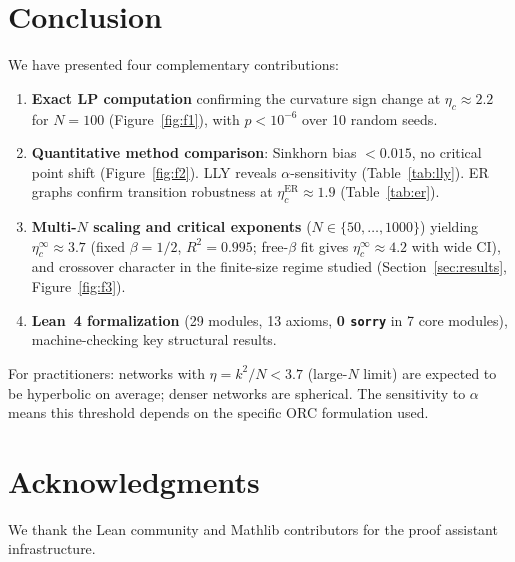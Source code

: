\documentclass[12pt]{article}
\newcommand{\etac}{\eta_c}
\newcommand{\sorry}{\texttt{sorry}}
\begin{document}
\section{Conclusion}
\label{sec:conc}

We have presented four complementary contributions:

\begin{enumerate}
  \item \textbf{Exact LP computation} confirming the curvature sign change at
  $\etac \approx 2.2$ for $N = 100$ (Figure~\ref{fig:f1}), with $p < 10^{-6}$ over 10
  random seeds.

  \item \textbf{Quantitative method comparison}: Sinkhorn bias $< 0.015$, no critical point
  shift (Figure~\ref{fig:f2}). LLY reveals $\alpha$-sensitivity (Table~\ref{tab:lly}). ER
  graphs confirm transition robustness at $\etac^{\mathrm{ER}} \approx 1.9$
  (Table~\ref{tab:er}).

  \item \textbf{Multi-$N$ scaling and critical exponents} ($N \in \{50,\ldots,1000\}$)
  yielding $\etac^\infty \approx 3.7$ (fixed $\beta = 1/2$, $R^2 = 0.995$; free-$\beta$
  fit gives $\etac^\infty \approx 4.2$ with wide CI), and crossover character in the
  finite-size regime studied (Section~\ref{sec:results}, Figure~\ref{fig:f3}).

  \item \textbf{Lean~4 formalization} (29 modules, 13 axioms, \textbf{0 \sorry{}} in 7
  core modules), machine-checking key structural results.
\end{enumerate}

For practitioners: networks with $\eta = k^2/N < 3.7$ (large-$N$ limit) are expected to be
hyperbolic on average; denser networks are spherical. The sensitivity to $\alpha$ means this
threshold depends on the specific ORC formulation used.

\section*{Acknowledgments}

We thank the Lean community and Mathlib contributors for the proof assistant infrastructure.
\end{document}
